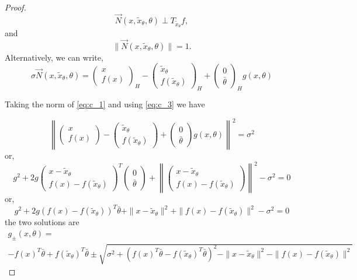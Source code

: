 \documentclass[12pt]{article}
\theoremstyle{remark}
\newcommand{\wtilde}[1]{\widetilde{#1}}
\begin{document}
\begin{appendices}
\begin{proof}
\begin{equation}
 \vec N(x,\wtilde{x}_\theta,\theta) \perp T_{\wtilde{x}_\theta}f
,\end{equation}
and 
\begin{equation}\label{eq:c_3}
\|\vec N(x,\wtilde{x}_\theta,\theta) \| = 1
.\end{equation}
Alternatively, we can write,
\begin{equation}\label{eq:c_1}
\sigma \vec N(x,\wtilde{x}_\theta,\theta) = 
\left(\begin{array}{c}
     x \\
     f(x) 
\end{array}\right)_H
-
\left(\begin{array}{c}
     \wtilde{x}_\theta \\
     f(\wtilde{x}_\theta) 
\end{array}\right)_H
+ 
\left(\begin{array}{c}
     0 \\
     \bar \theta
\end{array}\right)_H g(x,\theta)
\end{equation}


Taking the norm of \eqref{eq:c_1} and using \eqref{eq:c_3} we have  

\begin{equation*}
\left\|\left(\begin{array}{c}
     x \\
     f(x) 
\end{array}\right)
-
\left(\begin{array}{c}
     \wtilde{x}_\theta \\
     f(\wtilde{x}_\theta) 
\end{array}\right)
+ 
\left(\begin{array}{c}
     0 \\
     \bar  \theta
\end{array}\right) g(x,\theta)\right\|^2 = \sigma^2
\end{equation*}
or,
\[
g^2 + 2g \left(\begin{array}{c}
     x - \wtilde{x}_\theta \\
     f(x) - f(\wtilde{x}_\theta) 
\end{array}\right) ^T
\left(\begin{array}{c}
     0 \\
     \bar \theta
\end{array}\right)
+
\left\|\left(\begin{array}{c}
     x - \wtilde{x}_\theta \\
     f(x) - f(\wtilde{x}_\theta) 
\end{array}\right)\right\|^2 
-
\sigma^2 =0
\]
or,
\[
g^2 + 2g (f(x) - f(\wtilde{x}_\theta))^T \bar \theta 
+
\|x - \wtilde{x}_\theta\|^2 
+
\| f(x) - f(\wtilde{x}_\theta) \|^2
-
\sigma^2 =0
\]
the two solutions are 
\begin{multline}\label{eq:sol_g_pm}
    g_{\pm}(x,\theta) =\\ -f(x)^T \bar \theta + f(\wtilde{x}_\theta)^T \bar \theta \pm
    \sqrt{\sigma^2 + (f(x)^T \bar \theta - f(\wtilde{x}_\theta)^T \bar \theta)^2 - \|x- \wtilde{x}_\theta\|^2 - \|f(x)- f(\wtilde{x}_\theta) \|^2}
\end{multline}


\end{proof}
\end{appendices}
\end{document}
